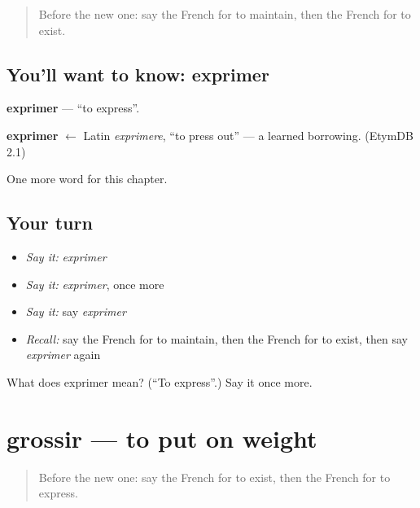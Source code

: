 \label{lesson:FR-C214-exprimer}



\begin{quote}
Before the new one: say the French for to maintain, then the French for to exist.
\end{quote}

\subsection*{You'll want to know: exprimer}
\textbf{exprimer} — \textquotedblleft{}to express\textquotedblright{}.

\begin{cousinweb}
\textbf{exprimer} $\leftarrow$ Latin \emph{exprimere}, \textquotedblleft{}to press out\textquotedblright{} — a learned borrowing. (EtymDB 2.1)
\end{cousinweb}

\begin{grammarlens}[title={What you've built}]
One more word for this chapter.
\end{grammarlens}

\subsection*{Your turn}
\begin{itemize}
\raggedright
  \item \emph{Say it:} \emph{exprimer}
  \item \emph{Say it:} \emph{exprimer}, once more
  \item \emph{Say it:} say \emph{exprimer}
  \item \emph{Recall:} say the French for to maintain, then the French for to exist, then say \emph{exprimer} again
\end{itemize}

\begin{tcolorbox}[breakable,colback=teal!4,colframe=teal!35!black,title={Before you move on}]
What does exprimer mean? (\textquotedblleft{}To express\textquotedblright{}.) Say it once more.
\end{tcolorbox}
\section[grossir]{grossir — to put on weight}

\label{lesson:FR-C214-grossir}



\begin{quote}
Before the new one: say the French for to exist, then the French for to express.
\end{quote}

